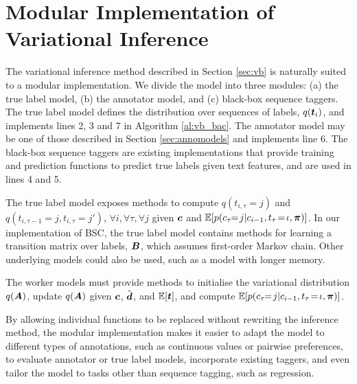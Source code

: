 \section{Modular Implementation of Variational Inference} \label{seq:modular}
 
The variational inference method described in Section  \ref{sec:vb}
is naturally suited to a modular implementation. We divide the model into 
three modules: (a) the true label model, (b) the annotator model, and (c) black-box sequence taggers.
The true label model defines the distribution over sequences of labels, $q(\boldsymbol t_i)$, 
and implements lines 2, 3 and 7 in Algorithm \ref{al:vb_bac}. The annotator model 
may be one of those described in Section \ref{sec:annomodels} and implements line 6.
The black-box sequence taggers are existing implementations that provide training and prediction functions
to predict true labels given text features, and are used in lines 4 and 5.

The true label model exposes methods to compute 
$q(t_{i,\tau}=j)$ and $q(t_{i,\tau-1}=j, t_{i,\tau}=j')$, $\forall i,\forall \tau,\forall j$
given $\boldsymbol c$ and $\mathbb{E}[p( c_{\tau} \!\!=\! j | c_{i-1}, t_{\tau} \!=\! \iota, \boldsymbol\pi )]$.
In our implementation of BSC, the true label model contains methods for learning a transition matrix over labels,
$\boldsymbol B$, which assumes first-order Markov chain. Other underlying models could also be used, such as a model with longer memory. 

The worker models must provide methods to initialise the variational distribution $q(\boldsymbol A)$,
update $q(\boldsymbol A)$ given $\boldsymbol c$, $\hat{\boldsymbol{d}}$, and $\mathbb{E}[\boldsymbol t]$, and
compute $\mathbb{E}[p( c_{\tau} \!\!=\! j | c_{i-1}, t_{\tau} \!=\! \iota, \boldsymbol\pi )]$.

By allowing individual functions to be replaced without rewriting the inference
method, the modular implementation makes it easier to adapt the model to different types of annotations, 
such as continuous values or pairwise preferences,
to evaluate annotator or true label models, incorporate existing taggers,
and even tailor the model to tasks other than sequence tagging, 
such as regression.

